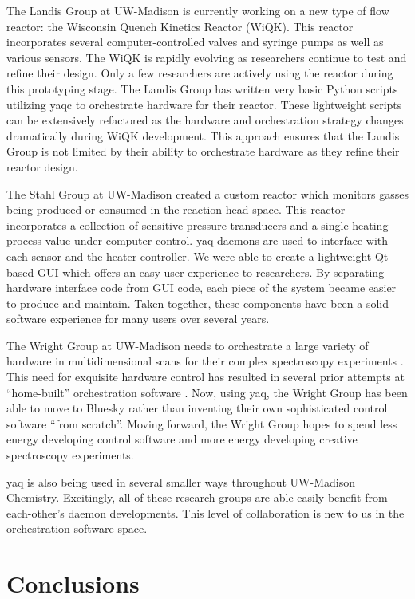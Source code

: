 \documentclass{article}
\begin{document}
The Landis Group at UW-Madison is currently working on a new type of flow reactor: the Wisconsin Quench Kinetics Reactor (WiQK).
This reactor incorporates several computer-controlled valves and syringe pumps as well as various sensors.
The WiQK is rapidly evolving as researchers continue to test and refine their design.
Only a few researchers are actively using the reactor during this prototyping stage.
The Landis Group has written very basic Python scripts utilizing yaqc to orchestrate hardware for their reactor.
These lightweight scripts can be extensively refactored as the hardware and orchestration strategy changes dramatically during WiQK development.
This approach ensures that the Landis Group is not limited by their ability to orchestrate hardware as they refine their reactor design.

The Stahl Group at UW-Madison created a custom reactor which monitors gasses being produced or consumed in the reaction head-space.  \cite{SalazarChaseA2021a}
This reactor incorporates a collection of sensitive pressure transducers and a single heating process value under computer control.
yaq daemons are used to interface with each sensor and the heater controller.
We were able to create a lightweight Qt-based GUI which offers an easy user experience to researchers.
By separating hardware interface code from GUI code, each piece of the system became easier to produce and maintain.
Taken together, these components have been a solid software experience for many users over several years.

The Wright Group at UW-Madison needs to orchestrate a large variety of hardware in multidimensional scans for their complex spectroscopy experiments \cite{MukamelShaul2000a, WrightJohnCurtis2011a}.
This need for exquisite hardware control has resulted in several prior attempts at ``home-built'' orchestration software \cite{CarlsonRogerJohn1988a, MeyerKentAlbert2004b, KainSchuyler2017a, ThompsonBlaiseJonathan2018a}.
Now, using yaq, the Wright Group has been able to move to Bluesky rather than inventing their own sophisticated control software ``from scratch''.
Moving forward, the Wright Group hopes to spend less energy developing control software and more energy developing creative spectroscopy experiments.

yaq is also being used in several smaller ways throughout UW-Madison Chemistry.
Excitingly, all of these research groups are able easily benefit from each-other's daemon developments.
This level of collaboration is new to us in the orchestration software space.

\section{Conclusions}

\clearpage


\end{document}
